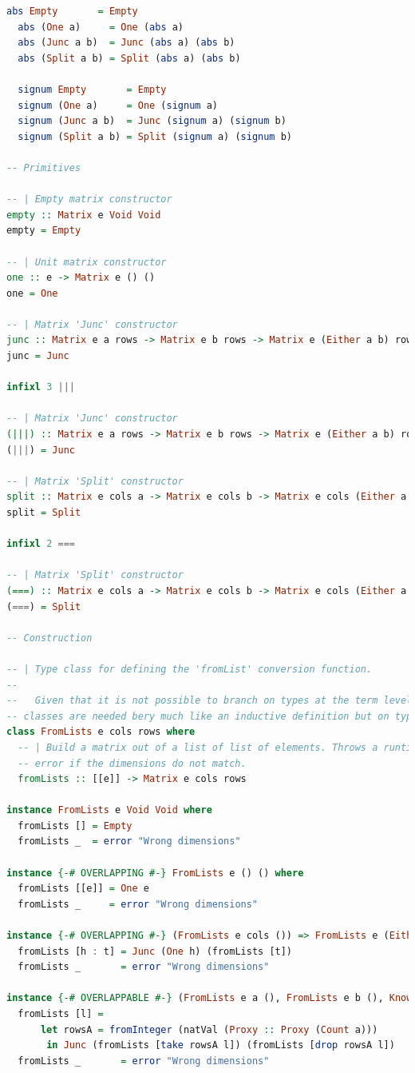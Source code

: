 \documentclass[
  oneside,
  11pt, a4paper,
  footinclude=true,
  headinclude=true,
  cleardoublepage=empty
]{scrbook}
\theoremstyle{definition}
\theoremstyle{definition}
\begin{document}
\begin{lstlisting}[language=Haskell, caption={Type safe inductive matrix library},captionpos=b]
  abs Empty       = Empty
  abs (One a)     = One (abs a)
  abs (Junc a b)  = Junc (abs a) (abs b)
  abs (Split a b) = Split (abs a) (abs b)

  signum Empty       = Empty
  signum (One a)     = One (signum a)
  signum (Junc a b)  = Junc (signum a) (signum b)
  signum (Split a b) = Split (signum a) (signum b)

-- Primitives

-- | Empty matrix constructor
empty :: Matrix e Void Void
empty = Empty

-- | Unit matrix constructor
one :: e -> Matrix e () ()
one = One

-- | Matrix 'Junc' constructor
junc :: Matrix e a rows -> Matrix e b rows -> Matrix e (Either a b) rows
junc = Junc

infixl 3 |||

-- | Matrix 'Junc' constructor
(|||) :: Matrix e a rows -> Matrix e b rows -> Matrix e (Either a b) rows
(|||) = Junc

-- | Matrix 'Split' constructor
split :: Matrix e cols a -> Matrix e cols b -> Matrix e cols (Either a b)
split = Split

infixl 2 ===

-- | Matrix 'Split' constructor
(===) :: Matrix e cols a -> Matrix e cols b -> Matrix e cols (Either a b)
(===) = Split

-- Construction

-- | Type class for defining the 'fromList' conversion function.
--
--   Given that it is not possible to branch on types at the term level type
-- classes are needed bery much like an inductive definition but on types.
class FromLists e cols rows where
  -- | Build a matrix out of a list of list of elements. Throws a runtime
  -- error if the dimensions do not match.
  fromLists :: [[e]] -> Matrix e cols rows

instance FromLists e Void Void where
  fromLists [] = Empty
  fromLists _  = error "Wrong dimensions"

instance {-# OVERLAPPING #-} FromLists e () () where
  fromLists [[e]] = One e
  fromLists _     = error "Wrong dimensions"

instance {-# OVERLAPPING #-} (FromLists e cols ()) => FromLists e (Either () cols) () where
  fromLists [h : t] = Junc (One h) (fromLists [t])
  fromLists _       = error "Wrong dimensions"

instance {-# OVERLAPPABLE #-} (FromLists e a (), FromLists e b (), KnownNat (Count a)) => FromLists e (Either a b) () where
  fromLists [l] = 
      let rowsA = fromInteger (natVal (Proxy :: Proxy (Count a)))
       in Junc (fromLists [take rowsA l]) (fromLists [drop rowsA l])
  fromLists _       = error "Wrong dimensions"


\end{lstlisting}
\end{document}
